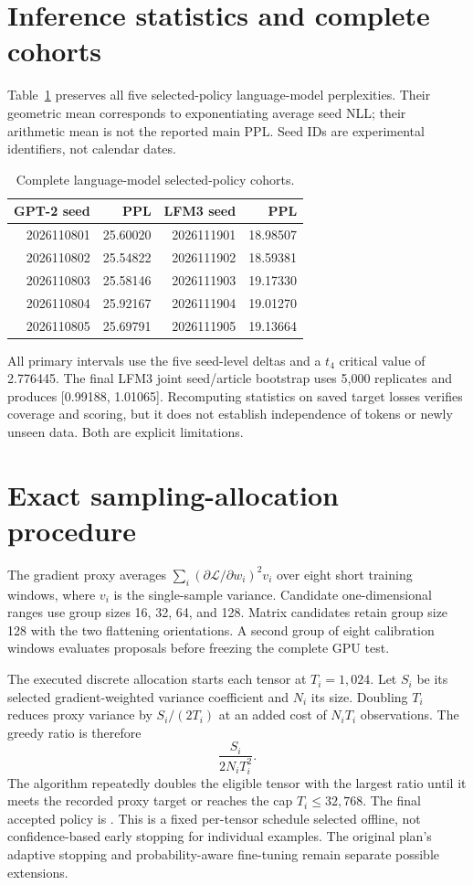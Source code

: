 \documentclass[11pt]{article}
\begin{document}
\section{Inference statistics and complete cohorts}
Table~\ref{tab:seeds} preserves all five selected-policy language-model perplexities. Their geometric mean corresponds to exponentiating average seed NLL; their arithmetic mean is not the reported main PPL. Seed IDs are experimental identifiers, not calendar dates.
\begin{table}[htbp]\centering\small
\caption{Complete language-model selected-policy cohorts.}\label{tab:seeds}
\begin{tabular}{rrrr}\toprule
GPT-2 seed & PPL & LFM3 seed & PPL\\\midrule
2026110801 & 25.60020 & 2026111901 & 18.98507\\
2026110802 & 25.54822 & 2026111902 & 18.59381\\
2026110803 & 25.58146 & 2026111903 & 19.17330\\
2026110804 & 25.92167 & 2026111904 & 19.01270\\
2026110805 & 25.69791 & 2026111905 & 19.13664\\\bottomrule
\end{tabular}
\end{table}

All primary intervals use the five seed-level deltas and a $t_4$ critical value of 2.776445. The final LFM3 joint seed/article bootstrap uses 5,000 replicates and produces [0.99188, 1.01065]. Recomputing statistics on saved target losses verifies coverage and scoring, but it does not establish independence of tokens or newly unseen data. Both are explicit limitations.

\section{Exact sampling-allocation procedure}
The gradient proxy averages $\sum_i (\partial\mathcal L/\partial w_i)^2v_i$ over eight short training windows, where $v_i$ is the single-sample variance. Candidate one-dimensional ranges use group sizes 16, 32, 64, and 128. Matrix candidates retain group size 128 with the two flattening orientations. A second group of eight calibration windows evaluates proposals before freezing the complete GPU test.

The executed discrete allocation starts each tensor at $T_i=1{,}024$. Let $S_i$ be its selected gradient-weighted variance coefficient and $N_i$ its size. Doubling $T_i$ reduces proxy variance by $S_i/(2T_i)$ at an added cost of $N_iT_i$ observations. The greedy ratio is therefore
\begin{equation}
 \frac{S_i}{2N_iT_i^2}.
\end{equation}
The algorithm repeatedly doubles the eligible tensor with the largest ratio until it meets the recorded proxy target or reaches the cap $T_i\leq32{,}768$. The final accepted policy is . This is a fixed per-tensor schedule selected offline, not confidence-based early stopping for individual examples. The original plan's adaptive stopping and probability-aware fine-tuning remain separate possible extensions.
\end{document}
